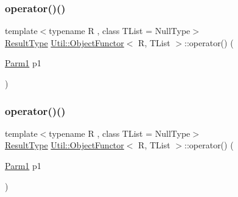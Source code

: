 \subsubsection{\texorpdfstring{operator()()}{operator()()}\hspace{0.1cm}{\footnotesize\ttfamily [3/12]}}
{\footnotesize\ttfamily template$<$typename R , class T\+List  = Null\+Type$>$ \\
\mbox{\hyperlink{classUtil_1_1ObjectFunctor_a77f816e98108848347d0dfc085090a1c}{Result\+Type}} \mbox{\hyperlink{classUtil_1_1ObjectFunctor}{Util\+::\+Object\+Functor}}$<$ R, T\+List $>$\+::operator() (\begin{DoxyParamCaption}\item[{\mbox{\hyperlink{classUtil_1_1ObjectFunctor_a199715d28029627c2ae7219c13b04d26}{Parm1}}}]{p1 }\end{DoxyParamCaption})\hspace{0.3cm}{\ttfamily [inline]}}

\mbox{\label{classUtil_1_1ObjectFunctor_affe11b4a42e49e60ac921c2353e3ce18}} 
\subsubsection{\texorpdfstring{operator()()}{operator()()}\hspace{0.1cm}{\footnotesize\ttfamily [4/12]}}
{\footnotesize\ttfamily template$<$typename R , class T\+List  = Null\+Type$>$ \\
\mbox{\hyperlink{classUtil_1_1ObjectFunctor_a77f816e98108848347d0dfc085090a1c}{Result\+Type}} \mbox{\hyperlink{classUtil_1_1ObjectFunctor}{Util\+::\+Object\+Functor}}$<$ R, T\+List $>$\+::operator() (\begin{DoxyParamCaption}\item[{\mbox{\hyperlink{classUtil_1_1ObjectFunctor_a199715d28029627c2ae7219c13b04d26}{Parm1}}}]{p1 }\end{DoxyParamCaption})\hspace{0.3cm}{\ttfamily [inline]}}

\mbox{\label{classUtil_1_1ObjectFunctor_a95148ad6414e7e28998227841c27be6c}} 
